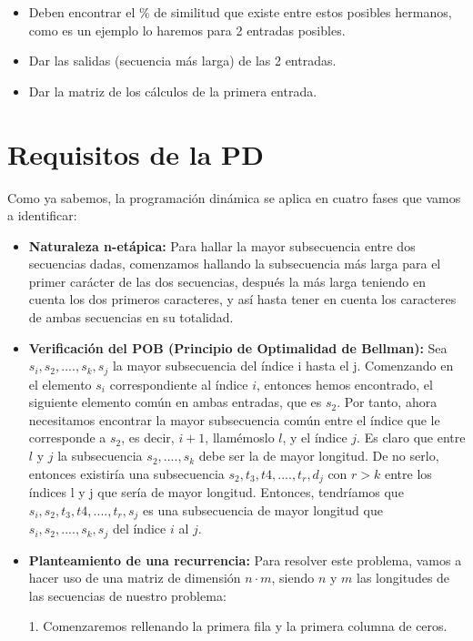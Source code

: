 \documentclass[10pt,a4paper]{article}
\begin{document}
\begin{itemize}
	\item Deben encontrar el \% de similitud que existe entre estos posibles hermanos, como es un ejemplo lo haremos para 2 entradas posibles.
	\item Dar las salidas (secuencia más larga) de las 2 entradas.
	\item Dar la matriz de los cálculos de la primera entrada.
\end{itemize}

\section{Requisitos de la PD}
Como ya sabemos, la programación dinámica se aplica en cuatro fases que vamos a identificar:

\begin{itemize}
	\item \textbf{Naturaleza n-etápica:} Para hallar la mayor subsecuencia entre dos secuencias dadas, comenzamos hallando la subsecuencia más larga para el primer carácter de las dos secuencias, después la más larga teniendo en cuenta los dos primeros caracteres, y así hasta tener en cuenta los caracteres de ambas secuencias en su totalidad.
	\item \textbf{Verificación del POB (Principio de Optimalidad de Bellman):} Sea $ s_i, s_2,...., s_k, s_j$ la mayor subsecuencia del índice i hasta el j.
	Comenzando en el elemento $s_i$ correspondiente al índice $i$, entonces hemos encontrado, el siguiente elemento común en ambas entradas, que es $s_2$. Por tanto, ahora necesitamos encontrar la mayor subsecuencia común entre el índice que le corresponde a $s_2$, es decir, $i+1$, llamémoslo $l$, y el índice $j$. Es claro que entre $l$ y $j$ la subsecuencia $s_2,...., s_k$ debe ser la de mayor longitud. De no serlo, entonces existiría una subsecuencia $s_2, t_3, t4, ...., t_r, d_j$ con $r>k$ entre los índices l y j que sería de mayor longitud. Entonces, tendríamos que $s_i, s_2, t_3, t4, ...., t_r, s_j$ es una subsecuencia de mayor longitud que $ s_i, s_2,...., s_k, s_j$ del índice $i$ al $j$.
	\item \textbf{Planteamiento de una recurrencia:} Para resolver este problema, vamos a hacer uso de una matriz de dimensión $n \cdot m$, siendo $n$ y $m$ las longitudes de las secuencias de nuestro problema: 
	
	1. Comenzaremos rellenando la primera fila y la primera columna de ceros.
	

\end{itemize}
\end{document}
